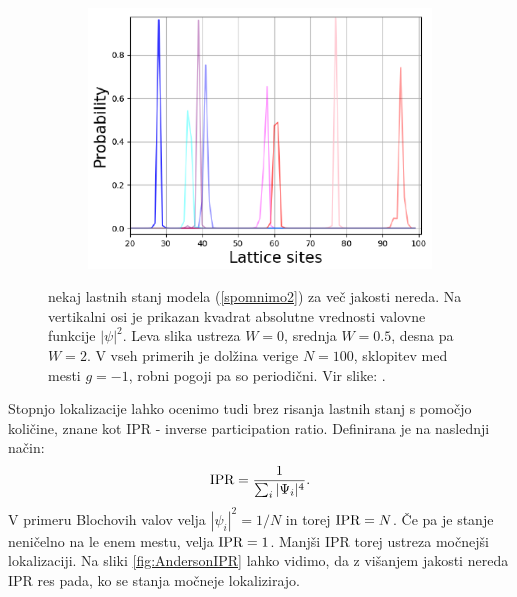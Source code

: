 \begin{figure}[!h]
\begin{subfigure}{.33\textwidth}
\includegraphics[trim={12 14 0 0},clip,width=\linewidth]{Figures/Anderson2.pdf}
\end{subfigure}
\caption{nekaj lastnih stanj modela (\ref{spomnimo2}) za več jakosti nereda. Na vertikalni osi je prikazan kvadrat absolutne vrednosti valovne funkcije $|\psi|^2$. Leva slika ustreza $W=0$, srednja $W=0.5$, desna pa $W=2$. V vseh primerih je dolžina verige $N=100$, sklopitev med mesti $g=-1$, robni pogoji pa so periodični. Vir slike: \cite{anderson}.}
\label{fig:AndersonW}
\end{figure} \newpage
Stopnjo lokalizacije lahko ocenimo tudi brez risanja lastnih stanj s pomočjo količine, znane kot IPR - inverse participation ratio. Definirana je na naslednji način:
\begin{equation}
\textup{IPR} = \frac{1}{\sum_i |\Psi_i|^4}.
\end{equation}
V primeru Blochovih valov velja $|\psi_i|^2 = 1/N$ in torej $\textup{IPR} = N$.
Če pa je stanje neničelno na le enem mestu, velja $\textup{IPR}=1$.
Manjši IPR torej ustreza močnejši lokalizaciji. Na sliki \ref{fig:AndersonIPR} lahko vidimo, da z višanjem jakosti nereda IPR res pada, ko se stanja močneje lokalizirajo.
